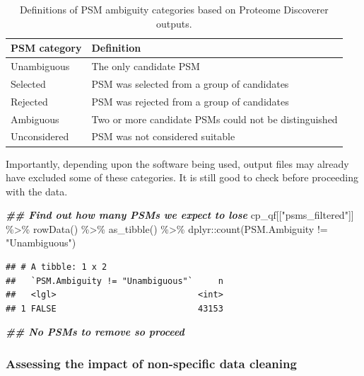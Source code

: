 \documentclass[9pt,a4paper,]{extarticle}
\newenvironment{Shaded}{\begin{snugshade}}{\end{snugshade}}
\newcommand{\DocumentationTok}[1]{\textcolor[rgb]{0.56,0.35,0.01}{\textbf{\textit{#1}}}}
\newcommand{\FunctionTok}[1]{\textcolor[rgb]{0.00,0.00,0.00}{#1}}
\newcommand{\NormalTok}[1]{#1}
\newcommand{\SpecialCharTok}[1]{\textcolor[rgb]{0.00,0.00,0.00}{#1}}
\newcommand{\StringTok}[1]{\textcolor[rgb]{0.31,0.60,0.02}{#1}}
\begin{document}
\begin{table}

\caption{\label{tab:table3}Definitions of PSM ambiguity categories based on Proteome Discoverer outputs.}
\centering
\begin{tabular}[t]{l|l}
\hline
PSM category & Definition\\
\hline
Unambiguous & The only candidate PSM\\
\hline
Selected & PSM was selected from a group of candidates\\
\hline
Rejected & PSM was rejected from a group of candidates\\
\hline
Ambiguous & Two or more candidate PSMs could not be distinguished\\
\hline
Unconsidered & PSM was not considered suitable\\
\hline
\end{tabular}
\end{table}

Importantly, depending upon the software being used, output files may already
have excluded some of these categories. It is still good to check before
proceeding with the data.

\begin{Shaded}
\begin{Highlighting}[]
\DocumentationTok{\#\# Find out how many PSMs we expect to lose}
\NormalTok{cp\_qf[[}\StringTok{"psms\_filtered"}\NormalTok{]] }\SpecialCharTok{\%\textgreater{}\%} 
  \FunctionTok{rowData}\NormalTok{() }\SpecialCharTok{\%\textgreater{}\%} 
  \FunctionTok{as\_tibble}\NormalTok{() }\SpecialCharTok{\%\textgreater{}\%} 
\NormalTok{  dplyr}\SpecialCharTok{::}\FunctionTok{count}\NormalTok{(PSM.Ambiguity }\SpecialCharTok{!=} \StringTok{"Unambiguous"}\NormalTok{)}
\end{Highlighting}
\end{Shaded}

\begin{verbatim}
## # A tibble: 1 x 2
##   `PSM.Ambiguity != "Unambiguous"`     n
##   <lgl>                            <int>
## 1 FALSE                            43153
\end{verbatim}

\begin{Shaded}
\begin{Highlighting}[]
\DocumentationTok{\#\# No PSMs to remove so proceed}
\end{Highlighting}
\end{Shaded}

\hypertarget{assessing-the-impact-of-non-specific-data-cleaning}{%
\subsubsection{Assessing the impact of non-specific data cleaning}\label{assessing-the-impact-of-non-specific-data-cleaning}}
\end{document}
